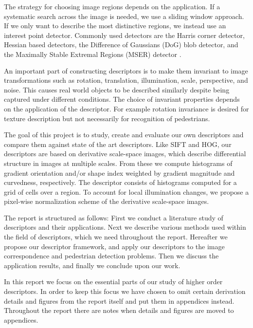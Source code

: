 \documentclass[thesis.tex]{subfiles}
\begin{document}
The strategy for choosing image regions depends on the application. If a systematic search across the image is needed, we use a sliding window approach. If we only want to describe the most distinctive regions, we instead use an interest point detector.  Commonly used detectors are the Harris corner detector, Hessian based detectors, the Difference of Gaussians (DoG) blob detector, and the Maximally Stable Extremal Regions (MSER) detector \cite{aanaes2012interesting,dahl2011finding}. 

An important part of constructing descriptors is to make them invariant to image transformations such as rotation, translation, illumination, scale, perspective, and noise. This causes real world objects to be described similarly despite being captured under different conditions. The choice of invariant properties depends on the application of the descriptor. For example rotation invariance is desired for texture description but not necessarily for recognition of pedestrians.

The goal of this project is to study, create and evaluate our own descriptors and compare them against state of the art descriptors. Like SIFT and HOG, our descriptors are based on derivative scale-space images, which describe differential structure in images at multiple scales. From these we compute histograms of gradient orientation and/or shape index weighted by gradient magnitude and curvedness, respectively. The descriptor consists of histograms computed for a grid of cells over a region. To account for local illumination changes, we propose a pixel-wise normalization scheme of the derivative scale-space images. 

The report is structured as follows: First we conduct a literature study of descriptors and their applications. Next we describe various methods used within the field of descriptors, which we need throughout the report. Hereafter we propose our descriptor framework, and apply our descriptors to the image correspondence and pedestrian detection problems. Then we discuss the application results, and finally we conclude upon our work.

In this report we focus on the essential parts of our study of higher order descriptors. In order to keep this focus we have chosen to omit certain derivation details and figures from the report itself and put them in appendices instead. Throughout the report there are notes when details and figures are moved to appendices. 

\subbibliography
\end{document}
